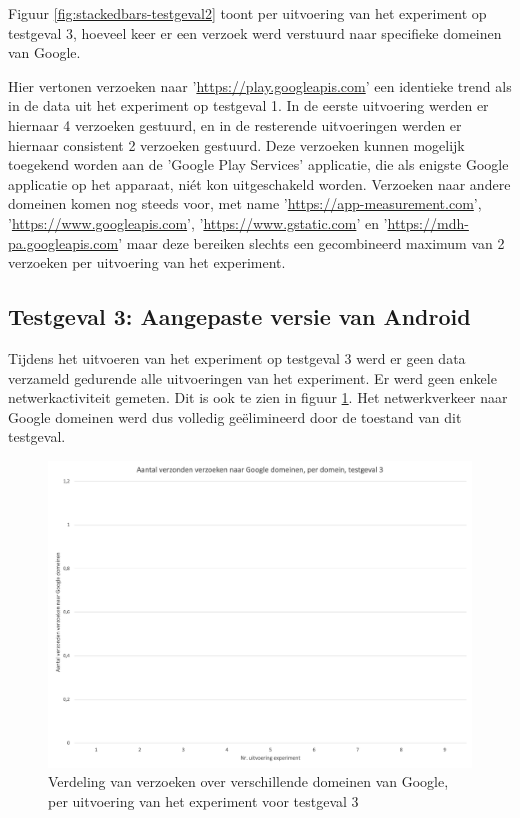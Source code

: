 Figuur \ref{fig:stackedbars-testgeval2} toont per uitvoering van het experiment op testgeval 3, hoeveel keer er een verzoek werd verstuurd naar specifieke domeinen van Google. 

Hier vertonen verzoeken naar '\url{https://play.googleapis.com}' een identieke trend als in de data uit het experiment op testgeval 1. In de eerste uitvoering werden er hiernaar 4 verzoeken gestuurd, en in de resterende uitvoeringen werden er hiernaar consistent 2 verzoeken gestuurd. Deze verzoeken kunnen mogelijk toegekend worden aan de 'Google Play Services' applicatie, die als enigste Google applicatie op het apparaat, niét kon uitgeschakeld worden. Verzoeken naar andere domeinen komen nog steeds voor, met name '\url{https://app-measurement.com}', '\url{https://www.googleapis.com}', '\url{https://www.gstatic.com}' en '\url{https://mdh-pa.googleapis.com}' maar deze bereiken slechts een gecombineerd maximum van 2 verzoeken per uitvoering van het experiment.

\subsection{Testgeval 3: Aangepaste versie van Android}
Tijdens het uitvoeren van het experiment op testgeval 3 werd er geen data verzameld gedurende alle uitvoeringen van het experiment. Er werd geen enkele netwerkactiviteit gemeten. Dit is ook te zien in figuur \ref{fig:stackedbars-testgeval3}. Het netwerkverkeer naar Google domeinen werd dus volledig geëlimineerd door de toestand van dit testgeval.

\begin{figure}
    \centering
    \includegraphics[width=1\textwidth]{experiment/grafieken/stackedbars-testgeval3.png}
    \caption{Verdeling van verzoeken over verschillende domeinen van Google, per uitvoering van het experiment voor testgeval 3}
    \label{fig:stackedbars-testgeval3}
\end{figure}

